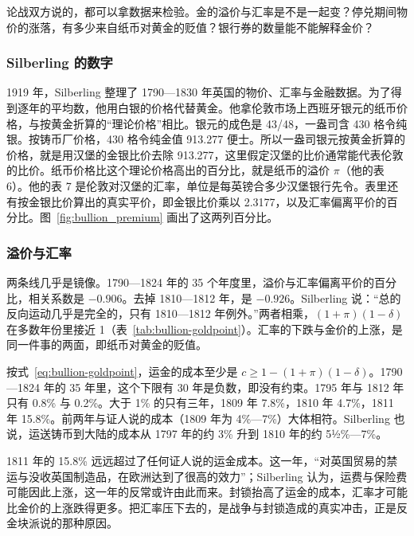 论战双方说的，都可以拿数据来检验。金的溢价与汇率是不是一起变？停兑期间物价的涨落，有多少来自纸币对黄金的贬值？银行券的数量能不能解释金价？

\subsubsection{Silberling 的数字}
1919 年，Silberling 整理了 1790—1830 年英国的物价、汇率与金融数据\cite{silberling1919}。为了得到逐年的平均数，他用白银的价格代替黄金\cite{silberling1919}。他拿伦敦市场上西班牙银元的纸币价格，与按黄金折算的“理论价格”相比。银元的成色是 43/48，一盎司含 430 格令纯银\cite{silberling1919}。按铸币厂价格，430 格令纯金值 913.277 便士。所以一盎司银元按黄金折算的价格，就是用汉堡的金银比价去除 913.277，这里假定汉堡的比价通常能代表伦敦的比价\cite{silberling1919}。纸币价格比这个理论价格高出的百分比，就是纸币的溢价 $\pi$（他的表 6）。他的表 7 是伦敦对汉堡的汇率，单位是每英镑合多少汉堡银行先令。表里还有按金银比价算出的真实平价，即金银比价乘以 2.3177，以及汇率偏离平价的百分比\cite{silberling1919}。图~\ref{fig:bullion_premium} 画出了这两列百分比。

\subsubsection{溢价与汇率}
两条线几乎是镜像。1790—1824 年的 35 个年度里，溢价与汇率偏离平价的百分比，相关系数是 $-0.906$。去掉 1810—1812 年，是 $-0.926$。Silberling 说：“总的反向运动几乎是完全的，只有 1810—1812 年例外。”\cite{silberling1919}两者相乘，$(1+\pi)(1-\delta)$ 在多数年份里接近 1（表~\ref{tab:bullion-goldpoint}）。汇率的下跌与金价的上涨，是同一件事的两面，即纸币对黄金的贬值。

按式~\eqref{eq:bullion-goldpoint}，运金的成本至少是 $c\ge1-(1+\pi)(1-\delta)$。1790—1824 年的 35 年里，这个下限有 30 年是负数，即没有约束。1795 年与 1812 年只有 0.8\% 与 0.2\%。大于 1\% 的只有三年，1809 年 7.8\%，1810 年 4.7\%，1811 年 15.8\%。前两年与证人说的成本（1809 年为 4\%—7\%）大体相符。Silberling 也说，运送铸币到大陆的成本从 1797 年的约 3\% 升到 1810 年的约 5½\%—7\%\cite{silberling1919}。

1811 年的 15.8\% 远远超过了任何证人说的运金成本。这一年，“对英国贸易的禁运与没收英国制造品，在欧洲达到了很高的效力”；Silberling 认为，运费与保险费可能因此上涨，这一年的反常或许由此而来\cite{silberling1919}。封锁抬高了运金的成本，汇率才可能比金价的上涨跌得更多。把汇率压下去的，是战争与封锁造成的真实冲击，正是反金块派说的那种原因。

